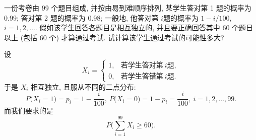\begin{example}\label{exam:4.4.9}
    一份考卷由 99 个题目组成, 并按由易到难顺序排列, 某学生答对第 1 题的概率为 0.99; 答对第 2 题的概率为 0.98; 一般地, 他答对第 $ i $题的概率为 $ 1 - i/100 $, $ i = 1, 2, \dotsc $.
    假如该学生回答各题目是相互独立的, 并且要正确回答其中 60 个题日以上 (包括 60 个) 才算通过考试.
    试计算该学生通过考试的可能性多大?
\end{example}

\begin{solution}
    设
    \begin{equation*}
        X_i =
        \begin{cases}
            1, & \text{若学生答对第} \ i \text{题},\\
            0, & \text{若学生答错第} \ i \text{题}.
        \end{cases}
    \end{equation*}
    于是 $ X_i $ 相互独立, 且服从不同的二点分布:
    \begin{equation*}
        P \bigl( X_i = 1 \bigr) = p_i = 1 - \frac{i}{100}, \
        P \bigl( X_i = 0 \bigr) = 1 - p_i = \frac{i}{100}, \
        i = 1,2, \dotsc, 99.
    \end{equation*}
    而我们要求的是
    \begin{equation*}
        P \biggl( \sum_{i=1}^99 X_i \geq 60 \biggr).
    \end{equation*}


\end{solution}
